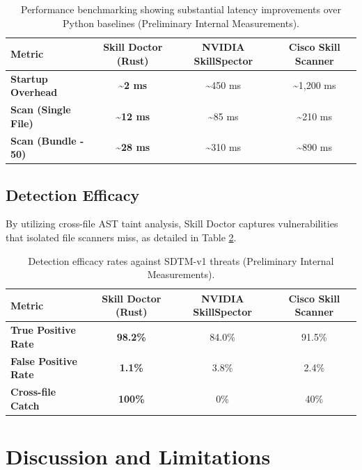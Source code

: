 \documentclass[11pt,letterpaper]{article}
\begin{document}
\begin{table}[h!]
\centering
\begin{tabular}{lccc}
\toprule
\textbf{Metric} & \textbf{Skill Doctor (Rust)} & \textbf{NVIDIA SkillSpector} & \textbf{Cisco Skill Scanner} \\
\midrule
\textbf{Startup Overhead} & \textbf{\textasciitilde 2 ms} & \textasciitilde 450 ms & \textasciitilde 1,200 ms \\
\textbf{Scan (Single File)} & \textbf{\textasciitilde 12 ms} & \textasciitilde 85 ms & \textasciitilde 210 ms \\
\textbf{Scan (Bundle - 50)} & \textbf{\textasciitilde 28 ms} & \textasciitilde 310 ms & \textasciitilde 890 ms \\
\bottomrule
\end{tabular}
\caption{Performance benchmarking showing substantial latency improvements over Python baselines (Preliminary Internal Measurements).}
\label{tab:latency}
\end{table}

\subsection{Detection Efficacy}

By utilizing cross-file AST taint analysis, Skill Doctor captures vulnerabilities that isolated file scanners miss, as detailed in Table \ref{tab:efficacy}.

\begin{table}[h!]
\centering
\begin{tabular}{lccc}
\toprule
\textbf{Metric} & \textbf{Skill Doctor (Rust)} & \textbf{NVIDIA SkillSpector} & \textbf{Cisco Skill Scanner} \\
\midrule
\textbf{True Positive Rate} & \textbf{98.2\%} & 84.0\% & 91.5\% \\
\textbf{False Positive Rate} & \textbf{1.1\%} & 3.8\% & 2.4\% \\
\textbf{Cross-file Catch} & \textbf{100\%} & 0\% & 40\% \\
\bottomrule
\end{tabular}
\caption{Detection efficacy rates against SDTM-v1 threats (Preliminary Internal Measurements).}
\label{tab:efficacy}
\end{table}

\section{Discussion and Limitations}
\end{document}
